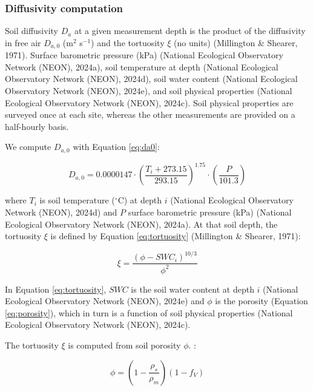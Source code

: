 \documentclass[
  letterpaper,
  DIV=11,
  numbers=noendperiod]{scrartcl}
\begin{document}
\subsubsection{Diffusivity computation}\label{sec-compute-diffusivity}

Soil diffusivity \(D_{a}\) at a given measurement depth is the product
of the diffusivity in free air \(D_{a,0}\) (m\(^{2}\) s\(^{-1}\)) and
the tortuosity \(\xi\) (no units) (Millington \& Shearer, 1971). Surface
barometric pressure (kPa) (National Ecological Observatory Network
(NEON), 2024a), soil temperature at depth (National Ecological
Observatory Network (NEON), 2024d), soil water content (National
Ecological Observatory Network (NEON), 2024e), and soil physical
properties (National Ecological Observatory Network (NEON), 2024c). Soil
physical properties are surveyed once at each site, whereas the other
measurements are provided on a half-hourly basis.

We compute \(D_{a,0}\) with Equation \ref{eq:da0}:

\begin{equation}
  D_{a,0} = 0.0000147 \cdot \left( \frac{T_{i} + 273.15}{293.15} \right)^{1.75} \cdot \left( \frac{P}{101.3} \right)
  \label{eq:da0}
\end{equation}

where \(T_{i}\) is soil temperature (\(^\circ\)C) at depth \(i\)
(National Ecological Observatory Network (NEON), 2024d) and \(P\)
surface barometric pressure (kPa) (National Ecological Observatory
Network (NEON), 2024a). At that soil depth, the tortuosity \(\xi\) is
defined by Equation \ref{eq:tortuosity} (Millington \& Shearer, 1971):

\begin{equation}
  \xi = \frac{(\phi - SWC_{i})^{10/3}}{\phi^{2}}
  \label{eq:tortuosity}
\end{equation}

In Equation \ref{eq:tortuosity}, \(SWC\) is the soil water content at
depth \(i\) (National Ecological Observatory Network (NEON), 2024e) and
\(\phi\) is the porosity (Equation \ref{eq:porosity}), which in turn is
a function of soil physical properties (National Ecological Observatory
Network (NEON), 2024c).

The tortuosity \(\xi\) is computed from soil porosity \(\phi\). :

\begin{equation}
  \phi = \left(1- \frac{\rho_{s}}{\rho_{m}} \right) \left(1-f_{V}\right)
  \label{eq:porosity}
\end{equation}
\end{document}

